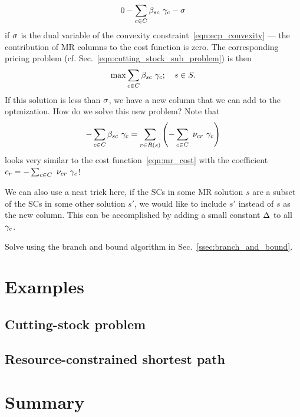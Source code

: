 \documentclass[letterpaper, 10pt, twocolumn, reqno]{amsart}
\begin{document}
{\begin{enumerate}[(a)]
            $$
            0 - \sum_{c \in C} \beta_{sc}\ \gamma_c - \sigma
            $$
            if $\sigma$ is the dual variable of the convexity constraint~\eqref{eqn:ecp_convexity} --- the contribution of MR columns to the cost function is zero. The corresponding pricing problem (cf. Sec.~\ref{eqn:cutting_stock_sub_problem}) is then
            $$
            \max \sum_{c \in C} \beta_{sc}\ \gamma_c; \quad s \in S.
            $$
            If this solution is less than $\sigma$, we have a new column that we can add to the optmization. How do we solve this new problem? Note that
            $$
            -\sum_{c \in C} \beta_{sc}\ \gamma_c = \sum_{r \in R(s)} \left(-\sum_{c \in C}\ \nu_{cr}\ \gamma_c\right)
            $$
            looks very similar to the cost function~\eqref{eqn:mr_cost} with the coefficient $c_r = -\sum_{c \in C}\ \nu_{cr}\ \g_c$!

            We can also use a neat trick here, if the SCs in some MR solution $s$ are a subset of the SCs in some other solution $s'$, we would like to include $s'$ instead of $s$ as the new column. This can be accomplished by adding a small constant $\Delta$ to all $\gamma_c$.
        \end{enumerate}

    \item Solve using the branch and bound algorithm in Sec.~\ref{ssec:branch_and_bound}.

}

\section{Examples}
\label{sec:examples}

\subsection{Cutting-stock problem}
\label{ssec:eg_cutting_stock}

\subsection{Resource-constrained shortest path}
\label{ssec:eg_shortest_path}


\section{Summary}
\label{sec:summary}


{
\small


}
\end{document}
